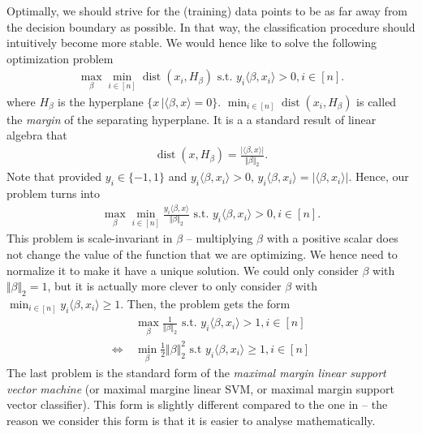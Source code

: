 \documentclass{article}
\newcommand{\sprod}[1]{\langle #1 \rangle}
\newcommand{\abs}[1]{\vert #1 \vert}
\newcommand{\norm}[1]{\Vert #1 \Vert}
\DeclareMathOperator{\dist}{dist}
\begin{document}
Optimally, we should strive for the (training) data points to be as far away from the decision boundary as possible. In that way, the classification procedure should intuitively become more stable. We would hence like to solve the following optimization problem
\begin{align*}
    \max_\beta \min_{i \in [n]} \dist(x_i,H_\beta) \text{ s.t. } y_i \sprod{\beta,x_i}>0, i \in [n].
\end{align*}
where $H_\beta$ is the hyperplane $\{x \, \vert \sprod{\beta,x}=0\}$. $ \min_{i \in [n]} \dist(x_i,H_\beta)$ is called the \emph{margin} of the separating hyperplane. It is a a standard result of linear algebra  that
\begin{align*}
    \dist(x,H_\beta) = \frac{\abs{\sprod{\beta,x}}}{\norm{\beta}_2}.
\end{align*}
Note that provided $y_i \in \{-1,1\}$ and $y_i\sprod{\beta,x_i}>0$, $y_i\sprod{\beta,x_i} = \abs{\sprod{\beta,x_i}}$. Hence, our problem turns into
\begin{align*}
    \max_\beta \min_{i \in [n]}\frac{y_i\sprod{\beta,x}}{\norm{\beta}_2}\text{ s.t. } y_i \sprod{\beta,x_i}>0, i \in [n].
\end{align*}
This problem is scale-invariant in $\beta$ -- multiplying $\beta$ with a positive scalar does not change the value of the function that we are optimizing. We hence need to normalize it to make it have a unique solution. We could only consider $\beta$ with $\norm{\beta}_2=1$, but it is actually more clever to only consider $\beta$ with $\min_{i \in [n]} y_i \sprod{\beta,x_i}\geq 1$. Then, the problem gets the form
\begin{align}
    & \max_\beta \frac{1}{\norm{\beta}_2}\text{ s.t. } y_i\sprod{\beta,x_i}>1, i \in [n] \nonumber \\
     \Longleftrightarrow \ & \min_\beta \tfrac{1}{2}\norm{\beta}_2^2 \text{ s.t } y_i\sprod{\beta,x_i}\geq 1, i \in [n] \label{eq:SVM}
\end{align}
The last problem is the standard form of the \emph{maximal margin linear support vector machine} (or maximal margine linear SVM, or maximal margin support vector classifier). This form is slightly different compared to the one in \cite{james2023introduction} -- the reason we consider this form is that it is easier to analyse mathematically.
\end{document}
